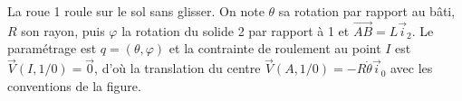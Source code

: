 \begin{corrigebox}
La roue 1 roule sur le sol sans glisser. On note $\theta$ sa rotation par
rapport au bâti, $R$ son rayon, puis $\varphi$ la rotation du solide 2 par
rapport à 1 et $\overrightarrow{AB}=L\vec i_2$. Le paramétrage est
$q=(\theta,\varphi)$ et la contrainte de roulement au point $I$ est
$\vec V(I,1/0)=\vec0$, d'où la translation du centre
$\vec V(A,1/0)=-R\dot\theta\vec i_0$ avec les conventions de la figure.
\end{corrigebox}
